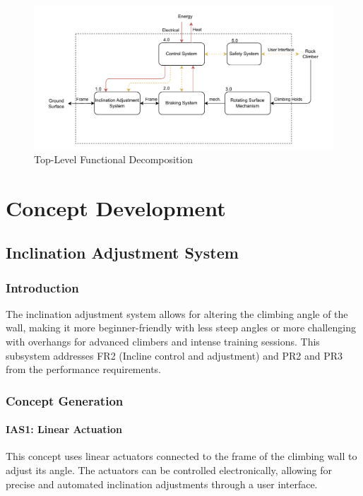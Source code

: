 \begin{figure}[H]
    \centering
    \includegraphics[width=1\linewidth]{figs/concept_design/Functional_Decomp_Flow.pdf}
    \caption{Top-Level Functional Decomposition}
    \label{fig:functional-decomp}
\end{figure}

\section{Concept Development}

\subsection{Inclination Adjustment System}

\subsubsection{Introduction}

The inclination adjustment system allows for altering the climbing angle of the wall, making it more beginner-friendly with less steep angles or more challenging with overhangs for advanced climbers and intense training sessions. This subsystem addresses FR2 (Incline control and adjustment) and PR2 and PR3 from the performance requirements.

\subsubsection{Concept Generation}

\paragraph{IAS1: Linear Actuation}

This concept uses linear actuators connected to the frame of the climbing wall to adjust its angle. The actuators can be controlled electronically, allowing for precise and automated inclination adjustments through a user interface.

